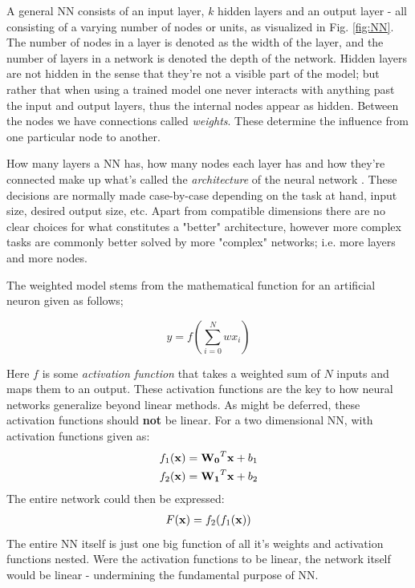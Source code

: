 A general NN consists of an input layer, $k$ hidden layers and an output layer - all consisting of a varying number of nodes or units, as visualized in Fig. \ref{fig:NN}. The number of nodes in a layer is denoted as the width of the layer, and the number of layers in a network is denoted the depth of the network. 
Hidden layers are not hidden in the sense that they're not a visible part of the model; but rather that when using a trained model one never interacts with anything past the input and output layers, thus the internal nodes appear as hidden. 
Between the nodes we have connections called \textit{weights}. These determine the influence from one particular node to another. 

How many layers a NN has, how many nodes each layer has and how they're connected make up what's called the \textit{architecture} of the neural network \citep[The architecture of Neural Networks]{nielsen}. These decisions are normally made case-by-case depending on the task at hand, input size, desired output size, etc. Apart from compatible dimensions there are no clear choices for what constitutes a "better" architecture, however more complex tasks are commonly better solved by more "complex" networks; i.e. more layers and more nodes. 

The weighted model stems from the mathematical function for an artificial neuron given as follows; 

\begin{equation}\label{artifical_neuron}
    y = f\left( \sum_{i=0}^Nwx_i \right) 
\end{equation}

Here $f$ is some \textit{activation function} that takes a weighted sum of $N$ inputs and maps them to an output. 
These activation functions are the key to how neural networks generalize beyond linear methods. As might be deferred, these activation functions should \textbf{not} be linear. 
For a two dimensional NN, with activation functions given as:
\begin{align}
\begin{split}
    f_1(\bold{x})&=\bold{W_0}^T\bold{x} + b_1 \\
    f_2(\bold{x})&=\bold{W_1}^T\bold{x} + b_2 
\end{split}
\end{align}
The entire network could then be expressed: 
\begin{align}
    \begin{split}
        F(\bold{x})=f_2(f_1(\bold{x}))
    \end{split}
\end{align}
The entire NN itself is just one big function of all it's weights and activation functions nested. Were the activation functions to be linear, the network itself would be linear - undermining the fundamental purpose of NN. 

